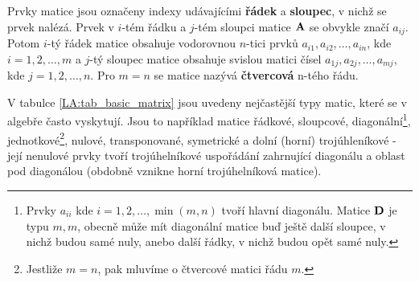       Prvky matice jsou označeny indexy udávajícími \textbf{řádek} a \textbf{sloupec}, v nichž se 
      prvek nalézá. Prvek v \(i\)-tém řádku a \(j\)-tém sloupci matice \(\mathbf{A}\) se obvykle 
      značí \(a_{ij}\). Potom \(i\)-tý řádek matice  obsahuje vodorovnou \(n\)-tici prvků \(a_{i1}, 
      a_{i2}, \ldots,a_{in} \), kde \(i=  1,2,\ldots,m\) a \(j\)-tý sloupec matice obsahuje svislou 
      matici čísel \(a_{1j},a_{2j},\ldots,a_{mj}\), kde \(j = 1,2,\ldots,n\). Pro \(m = n\) se 
      matice nazývá \textbf{čtvercová} n-tého řádu. 
      
      

      V tabulce \ref{LA:tab_basic_matrix} jsou uvedeny nejčastější typy matic, které se v algebře 
      často vyskytují. Jsou to například matice řádkové, sloupcové, diagonální\footnote{Prvky 
      \(a_{ii}\) kde \(i=1,2,\ldots,\min(m,n)\) tvoří hlavní diagonálu. Matice \(\mathbf{D}\) je 
      typu \(m,m\), obecně může mít diagonální matice buď ještě další sloupce, v nichž budou samé 
      nuly, anebo další řádky, v nichž budou opět samé nuly.}, jednotkové\footnote{Jestliže \(m = 
      n\), pak mluvíme o čtvercové matici řádu \(m\).}, nulové, transponované, symetrické a 
      dolní (horní) trojúhleníkové - její nenulové prvky tvoří trojúhelníkové uspořádání 
      zahrnující diagonálu a oblast pod diagonálou (obdobně vznikne horní trojúhelníková matice).


